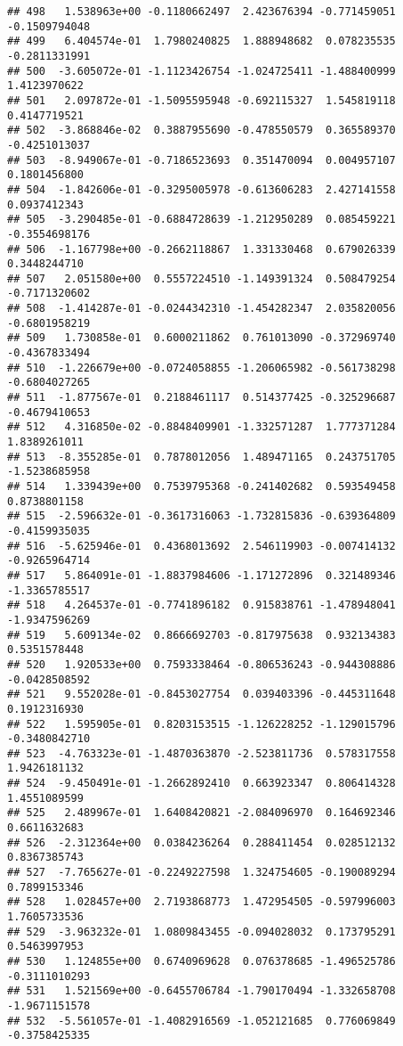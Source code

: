 \documentclass[
]{article}
\begin{document}
\begin{verbatim}
## 498   1.538963e+00 -0.1180662497  2.423676394 -0.771459051 -0.1509794048
## 499   6.404574e-01  1.7980240825  1.888948682  0.078235535 -0.2811331991
## 500  -3.605072e-01 -1.1123426754 -1.024725411 -1.488400999  1.4123970622
## 501   2.097872e-01 -1.5095595948 -0.692115327  1.545819118  0.4147719521
## 502  -3.868846e-02  0.3887955690 -0.478550579  0.365589370 -0.4251013037
## 503  -8.949067e-01 -0.7186523693  0.351470094  0.004957107  0.1801456800
## 504  -1.842606e-01 -0.3295005978 -0.613606283  2.427141558  0.0937412343
## 505  -3.290485e-01 -0.6884728639 -1.212950289  0.085459221 -0.3554698176
## 506  -1.167798e+00 -0.2662118867  1.331330468  0.679026339  0.3448244710
## 507   2.051580e+00  0.5557224510 -1.149391324  0.508479254 -0.7171320602
## 508  -1.414287e-01 -0.0244342310 -1.454282347  2.035820056 -0.6801958219
## 509   1.730858e-01  0.6000211862  0.761013090 -0.372969740 -0.4367833494
## 510  -1.226679e+00 -0.0724058855 -1.206065982 -0.561738298 -0.6804027265
## 511  -1.877567e-01  0.2188461117  0.514377425 -0.325296687 -0.4679410653
## 512   4.316850e-02 -0.8848409901 -1.332571287  1.777371284  1.8389261011
## 513  -8.355285e-01  0.7878012056  1.489471165  0.243751705 -1.5238685958
## 514   1.339439e+00  0.7539795368 -0.241402682  0.593549458  0.8738801158
## 515  -2.596632e-01 -0.3617316063 -1.732815836 -0.639364809 -0.4159935035
## 516  -5.625946e-01  0.4368013692  2.546119903 -0.007414132 -0.9265964714
## 517   5.864091e-01 -1.8837984606 -1.171272896  0.321489346 -1.3365785517
## 518   4.264537e-01 -0.7741896182  0.915838761 -1.478948041 -1.9347596269
## 519   5.609134e-02  0.8666692703 -0.817975638  0.932134383  0.5351578448
## 520   1.920533e+00  0.7593338464 -0.806536243 -0.944308886 -0.0428508592
## 521   9.552028e-01 -0.8453027754  0.039403396 -0.445311648  0.1912316930
## 522   1.595905e-01  0.8203153515 -1.126228252 -1.129015796 -0.3480842710
## 523  -4.763323e-01 -1.4870363870 -2.523811736  0.578317558  1.9426181132
## 524  -9.450491e-01 -1.2662892410  0.663923347  0.806414328  1.4551089599
## 525   2.489967e-01  1.6408420821 -2.084096970  0.164692346  0.6611632683
## 526  -2.312364e+00  0.0384236264  0.288411454  0.028512132  0.8367385743
## 527  -7.765627e-01 -0.2249227598  1.324754605 -0.190089294  0.7899153346
## 528   1.028457e+00  2.7193868773  1.472954505 -0.597996003  1.7605733536
## 529  -3.963232e-01  1.0809843455 -0.094028032  0.173795291  0.5463997953
## 530   1.124855e+00  0.6740969628  0.076378685 -1.496525786 -0.3111010293
## 531   1.521569e+00 -0.6455706784 -1.790170494 -1.332658708 -1.9671151578
## 532  -5.561057e-01 -1.4082916569 -1.052121685  0.776069849 -0.3758425335

\end{verbatim}
\end{document}
